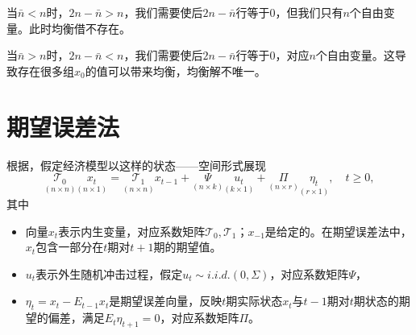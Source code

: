 当$\bar{n} < n$时，$2n-\bar{n} > n$，我们需要使后$2n-\bar{n}$行等于0，但我们只有$n$个自由变量。此时均衡借不存在。

当$\bar{n} > n$时，$2n-\bar{n} < n$，我们需要使后$2n-\bar{n}$行等于0，对应$n$个自由变量。这导致存在很多组$x_0$的值可以带来均衡，均衡解不唯一。


\section{期望误差法}
\label{sec:simple-sims-expectational-errors}
根据\cite{Sims:2002jc}，假定经济模型以这样的状态——空间形式展现
\begin{equation}
  \label{eq:simple-sims-state-space}
  \underset{(n \times n)}{\mathcal{T}_0} \underset{(n \times 1)}{x_t} = \underset{(n \times n)}{\mathcal{T}_{1}} x_{t-1} + \underset{(n \times k)}{\Psi} \underset{(k \times 1)}{u_t} + \underset{(n \times r)}{\Pi} \underset{(r \times 1)}{\eta_t}, \quad t \ge 0,
\end{equation}
其中
\begin{itemize}
  \item 向量$x_t$表示内生变量，对应系数矩阵$\mathcal{T}_0,\mathcal{T}_1$；$x_{-1}$是给定的。在期望误差法中，$x_t$包含一部分在$t$期对$t+1$期的期望值。
  \item $u_t$表示外生随机冲击过程，假定$u_t \sim i.i.d. (0, \Sigma)$，对应系数矩阵$\Psi$，
  \item $\eta_t = x_t - E_{t-1} x_t$是期望误差向量，反映$t$期实际状态$x_t$与$t-1$期对$t$期状态的期望的偏差，满足$E_t \eta_{t+1} = 0$，对应系数矩阵$\Pi$。
\end{itemize}

